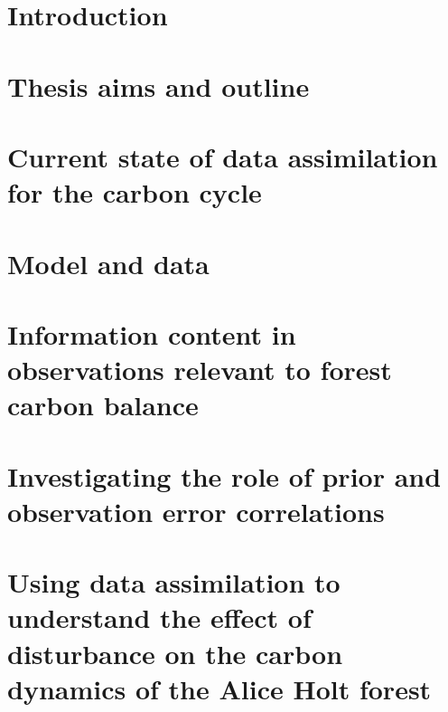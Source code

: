 





\tableofcontents


\chapter{Introduction}
\label{chap:intro}


\chapter{Thesis aims and outline}
\label{chap:aims}


\chapter{Current state of data assimilation for the carbon cycle}
\label{chap:litrev}


\chapter{Model and data}
\label{chap:data}


\chapter{Information content in observations relevant to forest carbon balance}
\label{chap:info_con}


\chapter{Investigating the role of prior and observation error correlations}
\label{chap:error_corrs}


\chapter{Using data assimilation to understand the effect of disturbance on the carbon dynamics of the Alice Holt forest}
\label{chap:disturbance}


